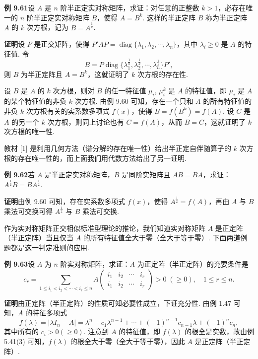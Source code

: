 \documentclass[UTF8, 12pt, fontset=fandol, oneside]{ctexart}
\begin{document}
\noindent\textbf{例 9.61}\quad 设 $A$ 是 $n$ 阶半正定实对称矩阵，求证：对任意的正整数 $k>1$，必存在唯一的 $n$ 阶半正定实对称矩阵 $B$，使得 $A=B^k$. 这样的半正定阵 $B$ 称为半正定阵 $A$ 的 $k$ 次方根，记为 $B=A^{\frac1k}$.

\noindent\textbf{证明}\quad 设 $P$ 是正交矩阵，使得 $P'AP=\operatorname{diag}\{\lambda_1,\lambda_2,\cdots,\lambda_n\}$，其中 $\lambda_i\ge0$ 是 $A$ 的特征值. 令
\[
B=P\operatorname{diag}\{\lambda_1^{\frac1k},\lambda_2^{\frac1k},\cdots,\lambda_n^{\frac1k}\}P',
\]
则 $B$ 为半正定阵且 $A=B^k$，这就证明了 $k$ 次方根的存在性.

设 $B$ 是 $A$ 的 $k$ 次方根，则对 $B$ 的任一特征值 $\mu_i$, $\mu_i^k$ 是 $A$ 的特征值，即 $\mu_i$ 是 $A$ 的某个特征值的非负 $k$ 次方根. 由例 9.60 可知，存在一个只和 $A$ 的所有特征值的非负 $k$ 次方根有关的实系数多项式 $f(x)$，使得 $B=f(B^k)=f(A)$. 设 $C$ 是 $A$ 的另一个 $k$ 次方根，则同上讨论也有 $C=f(A)$，从而 $B=C$，这就证明了 $k$ 次方根的唯一性.

教材 [1] 是利用几何方法（谱分解的存在唯一性）给出半正定自伴随算子的 $k$ 次方根的存在唯一性的，而上面我们用代数方法给出了另一证明.

\noindent\textbf{例 9.62}\quad 若 $A$ 是半正定实对称矩阵，$B$ 是同阶实矩阵且 $AB=BA$，求证：$A^{\frac12}B=BA^{\frac12}$.

\noindent\textbf{证明}\quad 由例 9.60 可知，存在实系数多项式 $f(x)$，使得 $A^{\frac12}=f(A)$，再由 $A$ 与 $B$ 乘法可交换可得 $A^{\frac12}$ 与 $B$ 乘法可交换.

作为实对称矩阵正交相似标准型理论的推论，我们知道实对称矩阵 $A$ 是正定阵（半正定阵）当且仅当 $A$ 的所有特征值全大于零（全大于等于零）. 下面两道例题都是这一判定准则的应用.

\noindent\textbf{例 9.63}\quad 设 $A$ 为 $n$ 阶实对称矩阵，求证：$A$ 为正定阵（半正定阵）的充要条件是
\[
c_r=\sum_{1\le i_1<i_2<\cdots<i_r\le n}
A\begin{pmatrix}
i_1&i_2&\cdots&i_r\\
i_1&i_2&\cdots&i_r
\end{pmatrix}>0\;(\ge0),\quad 1\le r\le n.
\]

\noindent\textbf{证明}\quad 由正定阵（半正定阵）的性质可知必要性成立，下证充分性. 由例 1.47 可知，$A$ 的特征多项式
\[
f(\lambda)=|\lambda I_n-A|=\lambda^n-c_1\lambda^{n-1}+\cdots+(-1)^{n-1}c_{n-1}\lambda+(-1)^nc_n,
\]
其中所有的 $c_i>0(\ge0)$. 注意到 $A$ 的特征值，即 $f(\lambda)$ 的根全是实数，故由例 5.41(3) 可知，$f(\lambda)$ 的根全大于零（全大于等于零），因此 $A$ 是正定阵（半正定阵）.
\end{document}
